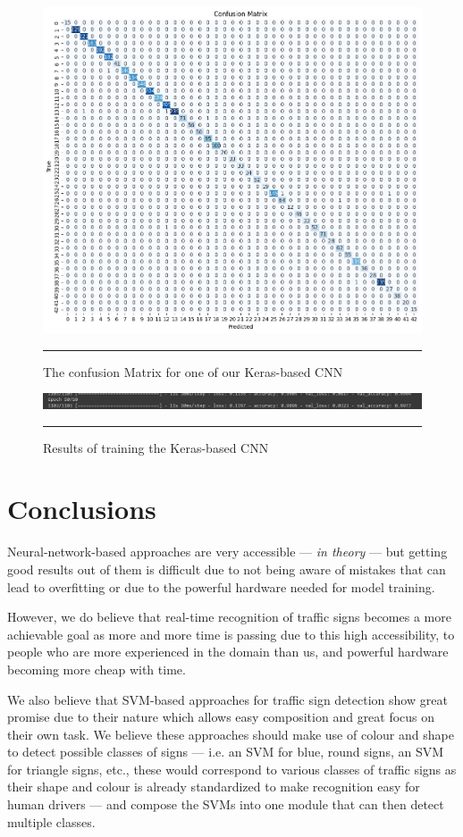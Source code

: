 \documentclass[conference]{IEEEtran}
\begin{document}
\begin{figure}
    \includegraphics[width=0.8\linewidth,]{Keras-Confusion-Matrix}
    \centering
    \label{img:confusion}
    \caption{The confusion Matrix for one of our Keras-based CNN}
    \noindent\rule{\textwidth}{1pt}
\end{figure}

\begin{figure}
    \includegraphics[width=\linewidth,]{Keras-Training-Results}
    \centering
    \label{img:results}
    \caption{Results of training the Keras-based CNN}
    \noindent\rule{\textwidth}{1pt}
\end{figure}

\section{Conclusions}

Neural-network-based approaches are very accessible --- \emph{in theory} --- but getting good
results out of them is difficult due to not being aware of mistakes that can lead to overfitting
or due to the powerful hardware needed for model training.

However, we do believe that real-time recognition of traffic signs becomes a more achievable goal
as more and more time is passing due to this high accessibility, to people who are more experienced
in the domain than us, and powerful hardware becoming more cheap with time.

We also believe that SVM-based approaches for traffic sign detection show great promise due to their nature
which allows easy composition and great focus on their own task. We believe these approaches should make use
of colour and shape to detect possible classes of signs --- i.e. an SVM for blue, round signs, an SVM for
triangle signs, etc., these would correspond to various classes of traffic signs as their shape and colour is
already standardized to make recognition easy for human drivers --- and compose the SVMs into one module that
can then detect multiple classes.
\end{document}
